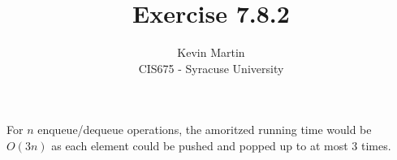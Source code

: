 \documentclass{article}
\author{Kevin Martin\\ CIS675 - Syracuse University}
\title{Exercise 7.8.2}
\begin{document}
\maketitle
For $n$ enqueue/dequeue operations, the amoritzed running time would be
$O(3n)$ as each element could be pushed and popped up to at most 3 times.
\end{document}
